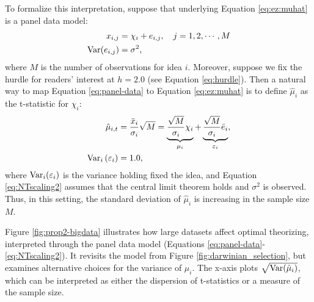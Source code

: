 \documentclass[12pt,english]{article}
\theoremstyle{plain}
\theoremstyle{plain}
\begin{document}
To formalize this interpretation, suppose that underlying Equation \eqref{eq:ez:muhat} is a panel data model:
\begin{align}\label{eq:panel-data}
    x_{i,j} &= \chi_i + e_{i,j}, \quad j=1,2,\cdots,M \\
     \text{Var}(e_{i,j}) &= \sigma^2,
\end{align}
where $M$ is the number of observations for idea $i$. Moreover, suppose we fix the hurdle for readers' interest at $h=2.0$ (see Equation \eqref{eq:hurdle}). Then a natural way to map Equation \eqref{eq:panel-data} to Equation \eqref{eq:ez:muhat} is to define $\hat{\mu}_i$ as the t-statistic for $\chi_i$:
\begin{align}\label{eq:NTscaling}
    \hat{\mu}_{i,t} &= \frac{\bar{x}_i}{\sigma_i} \sqrt{M}
    = \underbrace{\frac{\sqrt{M}}{\sigma_i} \chi_i}_{\mu_i}
    + \underbrace{\frac{\sqrt{M}}{\sigma_i}\bar{e}_i}_{\varepsilon_i}, \\
    \label{eq:NTscaling2}
    \text{Var}_{i}\left(\varepsilon_i\right) &= 1.0,
\end{align}
where $\text{Var}_{i}(\varepsilon_i)$ is the variance holding fixed the idea, and Equation \eqref{eq:NTscaling2} assumes that the central limit theorem holds and $\sigma^2$ is observed.  Thus, in this setting, the standard deviation of $\hat{\mu}_i$ is increasing in the sample size $M$. 

Figure \ref{fig:prop2-bigdata} illustrates how large datasets affect optimal theorizing, interpreted through the panel data model (Equations \eqref{eq:panel-data}-\eqref{eq:NTscaling2}). It revisits the model from Figure \ref{fig:darwinian_selection}, but examines alternative choices for the variance of $\mu_i$. The x-axis plots $\sqrt{\text{Var}(\hat{\mu}_i)}$, which can be interpreted as either the dispersion of t-statistics or  a measure of the sample size.  
\end{document}
